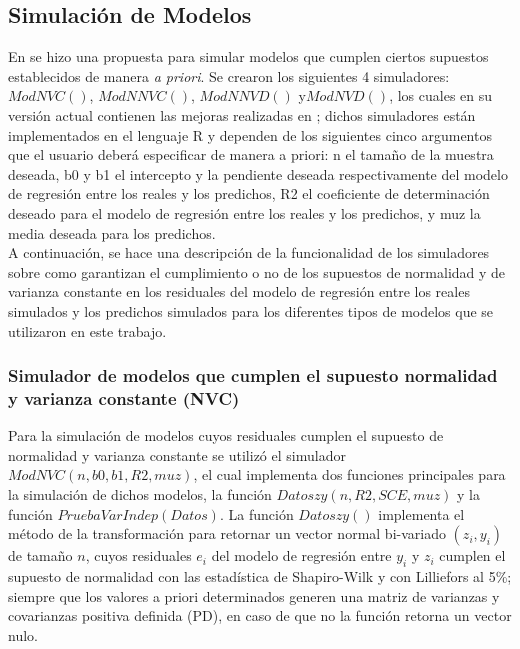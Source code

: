 \subsection{Simulación de Modelos}

En \textcite{febles-2014} se hizo una propuesta para simular modelos que cumplen ciertos supuestos establecidos de manera \textit{a priori}. Se crearon los siguientes 4 simuladores: $ModNVC()$, $ModNNVC()$, $ModNNVD()$ y$ ModNVD()$, los cuales en su versión actual contienen las mejoras realizadas en \textcite{zacarias-2023}; dichos simuladores están implementados en el lenguaje R y dependen de los siguientes cinco argumentos que el usuario deberá especificar de manera a priori: n el tamaño de la muestra deseada, b0 y b1 el intercepto y la pendiente deseada respectivamente del modelo de regresión entre los reales y los predichos, R2 el coeficiente de determinación deseado para el modelo de regresión entre los reales y los predichos, y muz la media deseada para los predichos. \\

A continuación, se hace una descripción de la funcionalidad de los simuladores sobre como garantizan el cumplimiento o no de los supuestos de normalidad y de varianza constante en los residuales del modelo de regresión entre los reales simulados y los predichos simulados para los diferentes tipos de modelos que se utilizaron en este trabajo.\\





\subsubsection{Simulador de modelos que cumplen el supuesto normalidad y varianza constante (NVC)}

Para la simulación de modelos cuyos residuales cumplen el supuesto de normalidad y varianza constante se utilizó el simulador $ModNVC(n,b0,b1,R2,muz)$, el cual implementa dos funciones principales para la simulación de dichos modelos, la función $Datoszy(n,R2,SCE,muz)$ y la función $PruebaVarIndep(Datos)$. La función $Datoszy()$ implementa el método de la transformación para retornar un vector normal bi-variado $(z_i,y_i)$ de tamaño $n$, cuyos residuales $e_i$ del  modelo de regresión  entre $y_i$ y $z_i$ cumplen el supuesto de normalidad con las estadística de Shapiro-Wilk y con Lilliefors al 5\%; siempre que los valores a priori determinados generen una matriz de varianzas y covarianzas positiva definida (PD), en caso de que no la función retorna un vector nulo.\\


